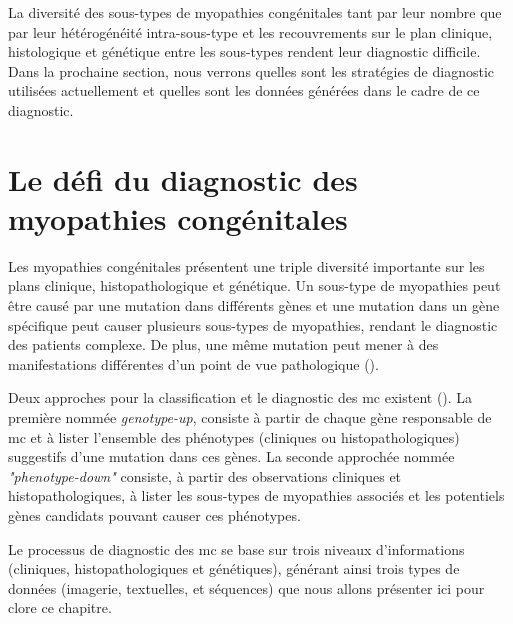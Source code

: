 La diversité des sous-types de myopathies congénitales tant par leur nombre que par leur hétérogénéité intra-sous-type et les recouvrements sur le plan clinique, histologique et génétique entre les sous-types rendent leur diagnostic difficile. Dans la prochaine section, nous verrons quelles sont les stratégies de diagnostic utilisées actuellement et quelles sont les données générées dans le cadre de ce diagnostic.

\section{Le défi du diagnostic des myopathies congénitales}
Les myopathies congénitales présentent une triple diversité importante sur les plans clinique, histopathologique et génétique. Un sous-type de myopathies peut être causé par une mutation dans différents gènes et une mutation dans un gène spécifique peut causer plusieurs sous-types de myopathies, rendant le diagnostic des patients complexe. De plus, une même mutation peut mener à des manifestations différentes d'un point de vue pathologique (\cite{north_approach_2014}). 

Deux approches pour la classification et le diagnostic des \gls{mc} existent (\cite{north_approach_2014}). La première nommée \textit{genotype-up}, consiste à partir de chaque gène responsable de \gls{mc} et à lister l'ensemble des phénotypes (cliniques ou histopathologiques) suggestifs d'une mutation dans ces gènes. La seconde approchée nommée \textit{"phenotype-down"} consiste, à partir des observations cliniques et histopathologiques, à lister les sous-types de myopathies associés et les potentiels gènes candidats pouvant causer ces phénotypes.

Le processus de diagnostic des \gls{mc} se base sur trois niveaux d'informations (cliniques, histopathologiques et génétiques), générant ainsi trois types de données (imagerie, textuelles, et séquences) que nous allons présenter ici pour clore ce chapitre.

